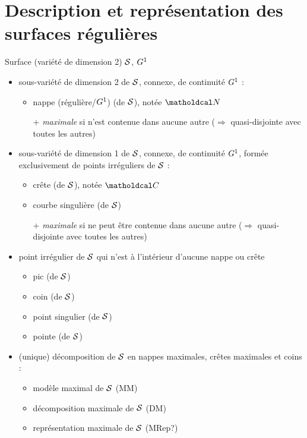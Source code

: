 \section*{Description et représentation des surfaces régulières \piecewise}
Surface (variété de dimension 2) $\mathcal{S}$, $G^{1}$ \piecewise
\begin{itemize}
	\item sous-variété de dimension 2 de $\mathcal{S}$, connexe, de continuité $G^{1}$ :
	\begin{itemize}
		\item nappe (régulière/$G^{1}$) (de $\mathcal{S}$), notée $\nappe$
		\item[+] \textit{maximale} si n'est contenue dans aucune autre ($\Rightarrow$ quasi-disjointe avec toutes les autres)
	\end{itemize}
	\item sous-variété de dimension 1 de $\mathcal{S}$, connexe, de continuité $G^{1}$, formée exclusivement de points irréguliers de $\mathcal{S}$ :
	\begin{itemize}
		\item crête (de $\mathcal{S}$), notée $\crete$
		\item courbe singulière (de $\mathcal{S}$)
		\item[+] \textit{maximale} si ne peut être contenue dans aucune autre ($\Rightarrow$ quasi-disjointe avec toutes les autres)
	\end{itemize}
	\item point irrégulier de $\mathcal{S}$ qui n'est à l'intérieur d'aucune nappe ou crête
	\begin{itemize}
		\item pic (de $\mathcal{S}$)
		\item coin (de $\mathcal{S}$)
		\item point singulier (de $\mathcal{S}$)
		\item pointe (de $\mathcal{S}$)
	\end{itemize}
	\item (unique) décomposition de $\mathcal{S}$ en nappes maximales, crêtes maximales et coins :
	\begin{itemize}
		\item modèle maximal de $\mathcal{S}$ (MM)
		\item décomposition maximale de $\mathcal{S}$ (DM)
		\item représentation maximale de $\mathcal{S}$ (MRep?)
	\end{itemize}
\end{itemize}

